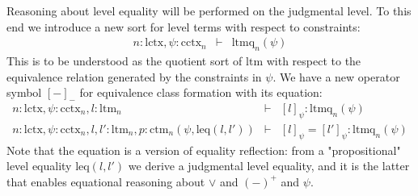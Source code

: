 \documentclass[11pt,a4paper]{article}
\theoremstyle{definition}
\def\lctx{\mathrm{lctx}}
\def\ltm{\mathrm{ltm}}
\def\ltmq{\mathrm{ltmq}}
\def\leq{\mathrm{leq}}
\def\cctx{\mathrm{cctx}}
\def\ctm{\mathrm{ctm}}
\begin{document}
Reasoning about level equality will be performed on the judgmental level. To this end we introduce a new sort for level terms with respect to constraints:
\begin{eqnarray*}
n : \lctx, \psi : \cctx_n &\vdash& \ltmq_n(\psi)
\end{eqnarray*}
This is to be understood as the quotient sort of $\ltm$ with respect to the equivalence relation generated by the constraints in $\psi$.
We have a new operator symbol $[-]_{-}$ for equivalence class formation with its equation:
\begin{eqnarray*}
n : \lctx, \psi : \cctx_n,  l : \ltm_n &\vdash& [l]_\psi  : \ltmq_n(\psi)\\
n : \lctx, \psi : \cctx_n,  l, l' : \ltm_n, p : \ctm_n(\psi,\leq(l,l')) &\vdash& [l]_\psi  = [l']_\psi  : \ltmq_n(\psi)
\end{eqnarray*}
Note that the equation is a version of equality reflection: from a "propositional" level equality $\leq(l,l')$ we derive a judgmental level equality, and it is the latter that enables equational reasoning about $\vee$ and $(-)^+$ and $\psi$.
\end{document}

